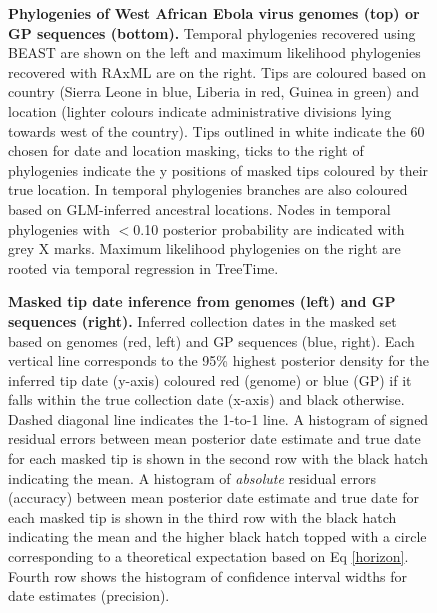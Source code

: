 \documentclass{bmcart}
\def\texttt{[image: ]}
\begin{document}
\begin{backmatter}
\begin{figure}[h]
 \centering
	\caption{\textbf{Phylogenies of West African Ebola virus genomes (top) or GP sequences (bottom).}
	Temporal phylogenies recovered using BEAST are shown on the left and maximum likelihood phylogenies recovered with RAxML are on the right.
  Tips are coloured based on country (Sierra Leone in blue, Liberia in red, Guinea in green) and location (lighter colours indicate administrative divisions lying towards west of the country).
  Tips outlined in white indicate the 60 chosen for date and location masking, ticks to the right of phylogenies indicate the y positions of masked tips coloured by their true location.
  In temporal phylogenies branches are also coloured based on GLM-inferred ancestral locations.
  Nodes in temporal phylogenies with $<$0.10 posterior probability are indicated with grey X marks.
  Maximum likelihood phylogenies on the right are rooted via temporal regression in TreeTime.
	}
	\label{trees}
\end{figure}


\begin{figure}[h]
 \centering
	\caption{\textbf{Masked tip date inference from genomes (left) and GP sequences (right).}
  Inferred collection dates in the masked set based on genomes (red, left) and GP sequences (blue, right).
  Each vertical line corresponds to the 95\% highest posterior density for the inferred tip date (y-axis) coloured red (genome) or blue (GP) if it falls within the true collection date (x-axis) and black otherwise.
  Dashed diagonal line indicates the 1-to-1 line.
  A histogram of signed residual errors between mean posterior date estimate and true date for each masked tip is shown in the second row with the black hatch indicating the mean.
  A histogram of \textit{absolute} residual errors (accuracy) between mean posterior date estimate and true date for each masked tip is shown in the third row with the black hatch indicating the mean and the higher black hatch topped with a circle corresponding to a theoretical expectation based on Eq \ref{horizon}.
  Fourth row shows the histogram of confidence interval widths for date estimates (precision).
	}
	\label{dates}
\end{figure}


\end{backmatter}
\end{document}
